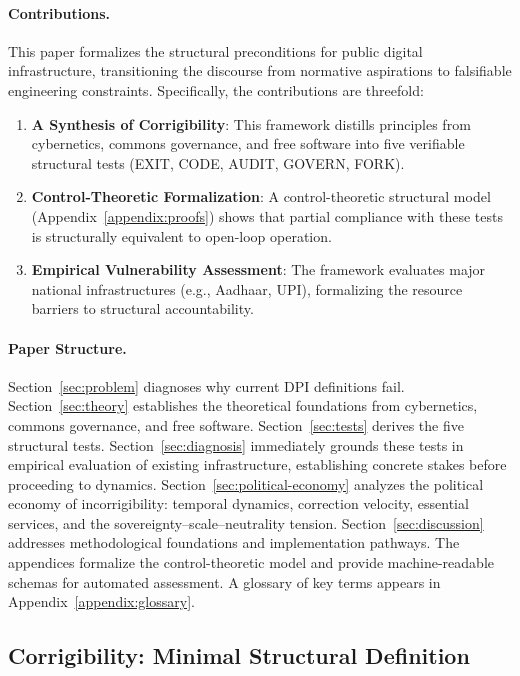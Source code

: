 \documentclass{article}
\begin{document}
\paragraph{Contributions.} This paper formalizes the structural preconditions for public digital infrastructure, transitioning the discourse from normative aspirations to falsifiable engineering constraints. Specifically, the contributions are threefold:
\begin{enumerate}[noitemsep]
    \item \textbf{A Synthesis of Corrigibility}: This framework distills principles from cybernetics, commons governance, and free software into five verifiable structural tests (EXIT, CODE, AUDIT, GOVERN, FORK).
    \item \textbf{Control-Theoretic Formalization}: A control-theoretic structural model (Appendix~\ref{appendix:proofs}) shows that partial compliance with these tests is structurally equivalent to open-loop operation.
    \item \textbf{Empirical Vulnerability Assessment}: The framework evaluates major national infrastructures (e.g., Aadhaar, UPI), formalizing the resource barriers to structural accountability.
\end{enumerate}

\paragraph{Paper Structure.} Section~\ref{sec:problem} diagnoses why current DPI definitions fail. Section~\ref{sec:theory} establishes the theoretical foundations from cybernetics, commons governance, and free software. Section~\ref{sec:tests} derives the five structural tests. Section~\ref{sec:diagnosis} immediately grounds these tests in empirical evaluation of existing infrastructure, establishing concrete stakes before proceeding to dynamics. Section~\ref{sec:political-economy} analyzes the political economy of incorrigibility: temporal dynamics, correction velocity, essential services, and the sovereignty--scale--neutrality tension. Section~\ref{sec:discussion} addresses methodological foundations and implementation pathways. The appendices formalize the control-theoretic model and provide machine-readable schemas for automated assessment. A glossary of key terms appears in Appendix~\ref{appendix:glossary}.

\subsection{Corrigibility: Minimal Structural Definition}
\label{subsec:minimal-definition}
\end{document}
